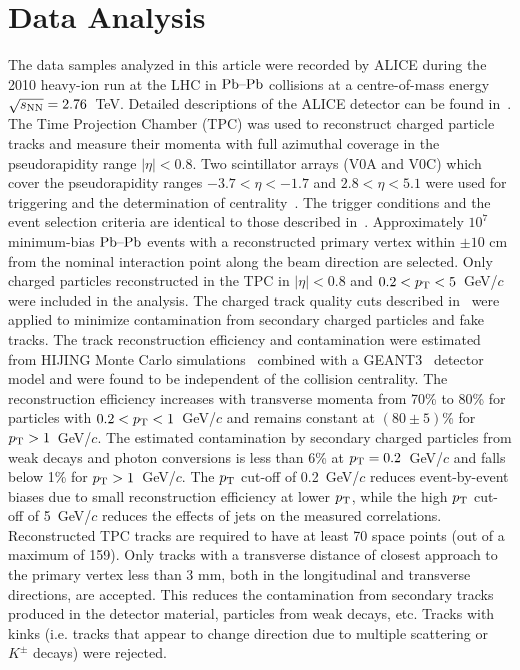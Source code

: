 \section{Data Analysis}
\label{sec:experiment}
The data samples analyzed in this article were recorded by ALICE during the 2010 heavy-ion run at the LHC in $\textnormal{Pb--Pb}$ collisions at a centre-of-mass energy $\sqrt{s_{\textnormal{NN}}}=2.76$~TeV.
Detailed descriptions of the ALICE detector can be found
in~\cite{Aamodt:2008zz,Carminati:2004fp,Alessandro:2006yt}. The Time
Projection Chamber (TPC) was used to reconstruct charged particle
tracks and measure their momenta with full azimuthal coverage in the
pseudorapidity range $|\eta|<0.8$. Two scintillator
arrays (V0A and V0C) which cover the pseudorapidity  ranges $-3.7<\eta<-1.7$
and $2.8<\eta<5.1$ were used for triggering and the determination of
centrality~\cite{Aamodt:2010cz}. The trigger
conditions and the event selection criteria are identical to those
described in~\cite{Aamodt:2010pa, Aamodt:2010cz}.
Approximately $10^7$ minimum-bias $\textnormal{Pb--Pb}$ events with
a reconstructed primary vertex within $\pm 10$ cm from the nominal
interaction point along the beam direction are selected. Only charged particles reconstructed in the TPC in $|\eta|<0.8$
and $0.2<p_{\rm T}<5$~GeV/$c$ were included in the analysis. The charged track quality cuts
described in~\cite{Aamodt:2010pa} were applied to minimize
contamination from secondary charged particles and fake tracks.
The track reconstruction efficiency and contamination
were estimated from HIJING Monte Carlo
simulations~\cite{Wang:1991hta} combined with a GEANT3~\cite{Brun:1994aa} detector model and were found to be independent of
the collision centrality. The reconstruction efficiency increases with transverse momenta from
70\% to 80\% for particles with $0.2<p_{\rm T}<1$~GeV/$c$ and remains
constant at $(80 \pm 5)$\% for $p_{\rm T}>1$~GeV/$c$. The estimated
contamination by secondary charged particles from weak decays and
photon conversions is less than 6\% at $p_{\rm T}=0.2$~GeV/$c$ and falls
below 1\% for $p_{\rm T}>1$~GeV/$c$.
The $p_{\rm T}$ cut-off of 0.2~GeV/$c$ reduces event-by-event biases due to small reconstruction efficiency 
at lower $p_{\rm T}$, while the high $p_{\rm T}$ cut-off of 5~GeV/$c$ reduces the effects of jets on the measured correlations. 
Reconstructed TPC tracks are required to have at least 70 space points (out of a maximum of 159). 
Only tracks with a transverse distance of closest approach to the primary vertex less than 3 mm, both in the longitudinal and transverse directions, are accepted. This reduces the contamination from secondary tracks produced in the detector material, particles from weak decays, etc. Tracks with kinks (i.e. tracks that appear to change direction due to multiple scattering or $K^{\pm}$ decays) were rejected.


